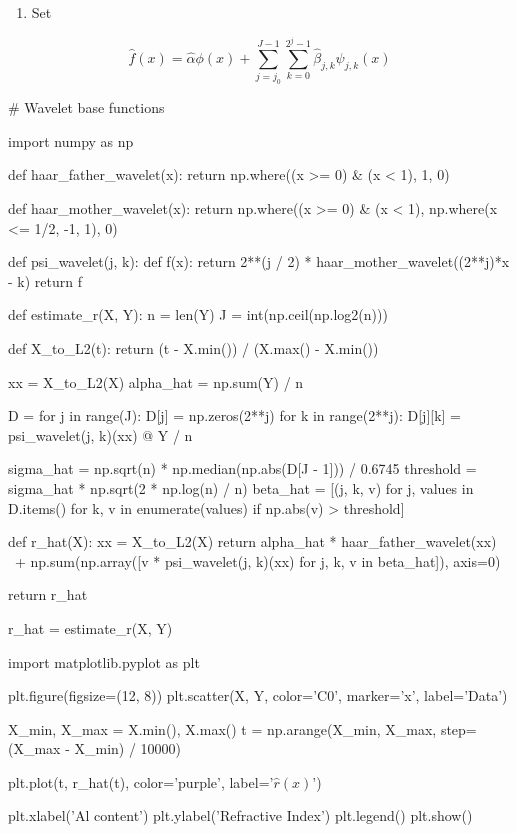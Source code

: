 \begin{enumerate}[tightlist,label={\arabic*.},resume]
\item
  Set
\end{enumerate}

\[ \hat{f}(x) = \hat{\alpha} \phi(x) + \sum_{j = j_0}^{J - 1} \sum_{k = 0}^{2^j - 1} \hat{\beta}_{j, k} \psi_{j, k}(x) \]

\begin{python}
# Wavelet base functions

import numpy as np

def haar_father_wavelet(x):
    return np.where((x >= 0) & (x < 1), 1, 0)

def haar_mother_wavelet(x):
    return np.where((x >= 0) & (x < 1),  np.where(x <= 1/2, -1, 1), 0)

def psi_wavelet(j, k):
    def f(x):
        return 2**(j / 2) * haar_mother_wavelet((2**j)*x - k)
    return f
\end{python}

\begin{python}
def estimate_r(X, Y):
    n = len(Y)
    J = int(np.ceil(np.log2(n)))

    def X_to_L2(t):
        return (t - X.min()) / (X.max() - X.min())

    xx = X_to_L2(X)
    alpha_hat = np.sum(Y) / n

    D = {}
    for j in range(J):
        D[j] = np.zeros(2**j)
        for k in range(2**j):
            D[j][k] = psi_wavelet(j, k)(xx) @ Y / n

    sigma_hat = np.sqrt(n) * np.median(np.abs(D[J - 1])) / 0.6745
    threshold = sigma_hat * np.sqrt(2 * np.log(n) / n)
    beta_hat = [(j, k, v) for j, values in D.items() for k, v in enumerate(values) if np.abs(v) > threshold]

    def r_hat(X):
        xx = X_to_L2(X)
        return alpha_hat * haar_father_wavelet(xx) \
            + np.sum(np.array([v * psi_wavelet(j, k)(xx) for j, k, v in beta_hat]), axis=0)
    
    return r_hat
\end{python}

\begin{python}
r_hat = estimate_r(X, Y)
\end{python}

\begin{python}
import matplotlib.pyplot as plt

plt.figure(figsize=(12, 8))
plt.scatter(X, Y, color='C0', marker='x', label='Data')

X_min, X_max = X.min(), X.max()
t = np.arange(X_min, X_max, step=(X_max - X_min) / 10000)

plt.plot(t, r_hat(t), color='purple', label='$\hat{r}(x)$')

plt.xlabel('Al content')
plt.ylabel('Refractive Index')
plt.legend()
plt.show()
\end{python}

